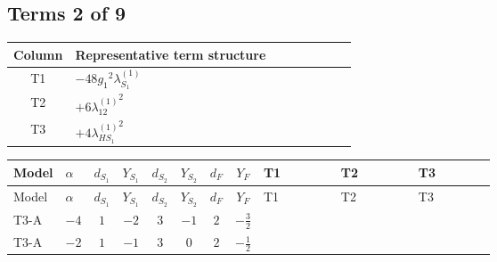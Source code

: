 \documentclass[8pt]{article}
\begin{document}
\begin{landscape}
\subsection*{Terms 2 of 9}
\begin{center}
\begin{tabular}{@{}c >{\raggedright\arraybackslash}p{0.82\linewidth}@{}}
\toprule
Column & Representative term structure \\
\midrule
T1 & \(\displaystyle -48 {g_1}^2 {\lambda_{S_1}^{(1)}}\) \\
\midrule
T2 & \(\displaystyle +6 {\lambda_{12}^{(1)}}^2\) \\
\midrule
T3 & \(\displaystyle +4 {\lambda_{HS_1}^{(1)}}^2\) \\
\midrule
\bottomrule
\end{tabular}
\end{center}
\smallskip
\tiny
\begin{longtable}{@{}llcccccc >{\raggedright\arraybackslash}p{0.21\linewidth} >{\raggedright\arraybackslash}p{0.21\linewidth} >{\raggedright\arraybackslash}p{0.21\linewidth}@{}}
\toprule
Model & $\alpha$ & $d_{S_1}$ & $Y_{S_1}$ & $d_{S_2}$ & $Y_{S_2}$ & $d_F$ & $Y_F$ & T1 & T2 & T3 \\
\midrule
\endfirsthead
\toprule
Model & $\alpha$ & $d_{S_1}$ & $Y_{S_1}$ & $d_{S_2}$ & $Y_{S_2}$ & $d_F$ & $Y_F$ & T1 & T2 & T3 \\
\midrule
\endhead
T3-A & $-4$ & $1$ & $-2$ & $3$ & $-1$ & $2$ & $-\frac{3}{2}$ & \scriptsize\adjustbox{max width=\linewidth}{$\begin{gathered} -48 {g_1}^2 {\lambda_{S_1}^{(1)}}\end{gathered}$} & \scriptsize\adjustbox{max width=\linewidth}{$\begin{gathered} +6 {\lambda_{12}^{(1)}}^2\end{gathered}$} & \scriptsize\adjustbox{max width=\linewidth}{$\begin{gathered} +4 {\lambda_{HS_1}^{(1)}}^2\end{gathered}$} \\
\midrule
T3-A & $-2$ & $1$ & $-1$ & $3$ & $0$ & $2$ & $-\frac{1}{2}$ & \scriptsize\adjustbox{max width=\linewidth}{$\begin{gathered} -12 {g_1}^2 {\lambda_{S_1}^{(1)}}\end{gathered}$} & \scriptsize\adjustbox{max width=\linewidth}{$\begin{gathered} +6 {\lambda_{12}^{(1)}}^2\end{gathered}$} & \scriptsize\adjustbox{max width=\linewidth}{$\begin{gathered} +4 {\lambda_{HS_1}^{(1)}}^2\end{gathered}$} \\

\end{longtable}
\end{landscape}
\end{document}
